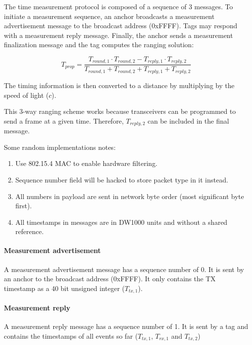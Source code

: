 \documentclass[a4paper, 12pt]{scrreprt}
\begin{document}
The time measurement protocol is composed of a sequence of 3 messages.
To initiate a measurement sequence, an anchor broadcasts a measurement advertisement message to the broadcast address (0xFFFF).
Tags may respond with a measurement reply message.
Finally, the anchor sends a measurement finalization message and the tag computes the ranging solution:

\begin{equation}
T_{prop} = \frac{T_{round,1} \cdot T_{round,2} - T_{reply,1} \cdot T_{reply,2}}{T_{round,1} + T_{round,2} + T_{reply,1} + T_{reply,2}}
\label{eqn:ranging}
\end{equation}

The timing information is then converted to a distance by multiplying by the speed of light ($c$).

This 3-way ranging scheme works because transceivers can be programmed to send a frame at a given time.
Therefore, $T_{reply,2}$ can be included in the final message.

Some random implementations notes:

\begin{enumerate}
    \item Use 802.15.4 MAC to enable hardware filtering.
    \item Sequence number field will be hacked to store packet type in it instead.
    \item All numbers in payload are sent in network byte order (most significant byte first).
    \item All timestamps in messages are in DW1000 units and without a shared reference.
\end{enumerate}

\paragraph{Measurement advertisement}
A measurement advertisement message has a sequence number of 0.
It is sent by an anchor to the broadcast address (0xFFFF).
It only contains the TX timestamp as a 40 bit unsigned integer ($T_{tx,1}$).

\paragraph{Measurement reply}
A measurement reply message has a sequence number of 1.
It is sent by a tag and contains the timestamps of all events so far ($T_{tx,1}$, $T_{rx,1}$ and $T_{tx,2}$)
\end{document}
